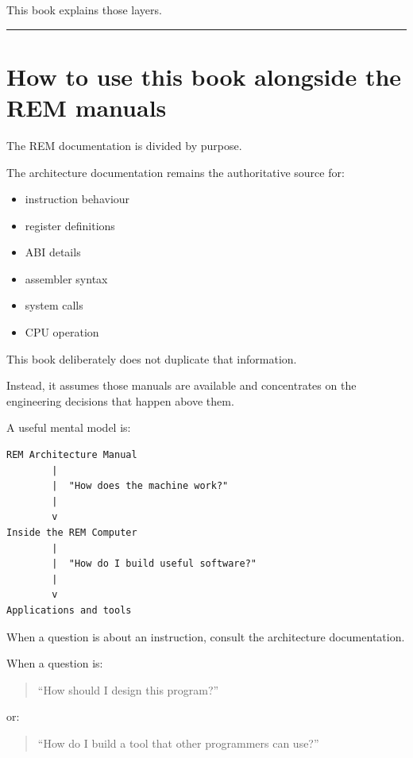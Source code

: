 \documentclass[
  oneside,
  openany]{book}
\providecommand{\tightlist}{%
  \setlength{\itemsep}{0pt}\setlength{\parskip}{0pt}}
\begin{document}
This book explains those layers.

\begin{center}\rule{0.5\linewidth}{0.5pt}\end{center}

\hypertarget{how-to-use-this-book-alongside-the-rem-manuals}{%
\section{How to use this book alongside the REM
manuals}\label{how-to-use-this-book-alongside-the-rem-manuals}}

The REM documentation is divided by purpose.

The architecture documentation remains the authoritative source for:

\begin{itemize}
\tightlist
\item
  instruction behaviour
\item
  register definitions
\item
  ABI details
\item
  assembler syntax
\item
  system calls
\item
  CPU operation
\end{itemize}

This book deliberately does not duplicate that information.

Instead, it assumes those manuals are available and concentrates on the
engineering decisions that happen above them.

A useful mental model is:

\begin{verbatim}
REM Architecture Manual
        |
        |  "How does the machine work?"
        |
        v
Inside the REM Computer
        |
        |  "How do I build useful software?"
        |
        v
Applications and tools
\end{verbatim}

When a question is about an instruction, consult the architecture
documentation.

When a question is:

\begin{quote}
``How should I design this program?''
\end{quote}

or:

\begin{quote}
``How do I build a tool that other programmers can use?''
\end{quote}
\end{document}
